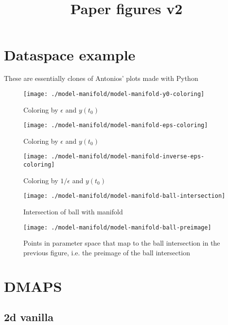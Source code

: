 \documentclass[11pt]{article}
\title{Paper figures v2}
\begin{document}
\maketitle

\section{Dataspace example}

These are essentially clones of Antonios' plots made with Python

\begin{figure}[htbp]
  \centering
  \texttt{[image: ./model-manifold/model-manifold-y0-coloring]}
  \caption{Coloring by $\epsilon$ and $y(t_0)$}
\end{figure}

\begin{figure}[htbp]
  \centering
  \texttt{[image: ./model-manifold/model-manifold-eps-coloring]}
  \caption{Coloring by $\epsilon$ and $y(t_0)$}
\end{figure}

\begin{figure}[htbp]
  \centering
  \texttt{[image: ./model-manifold/model-manifold-inverse-eps-coloring]}
  \caption{Coloring by $1/\epsilon$ and $y(t_0)$}
\end{figure}

\begin{figure}[htbp]
  \centering
  \texttt{[image: ./model-manifold/model-manifold-ball-intersection]}
  \caption{Intersection of ball with manifold}
\end{figure}

\begin{figure}[htbp]
  \centering
  \texttt{[image: ./model-manifold/model-manifold-ball-preimage]}
  \caption{Points in parameter space that map to the ball intersection
  in the previous figure, i.e. the preimage of the ball intersection}
\end{figure}

\clearpage

\section{DMAPS}

\subsection{2d vanilla}
\end{document}
